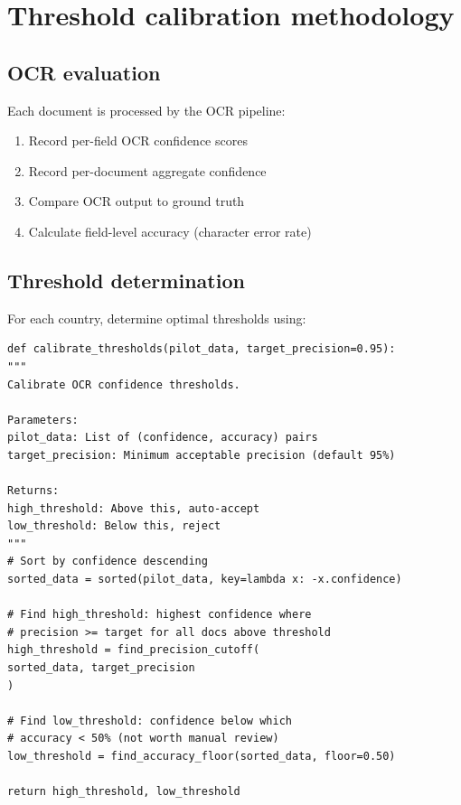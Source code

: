 \documentclass[11pt,a4paper,twoside]{report}
\begin{document}
\section{Threshold calibration methodology}

\subsection{OCR evaluation}

Each document is processed by the OCR pipeline:
\begin{enumerate}
\item Record per-field OCR confidence scores
\item Record per-document aggregate confidence
\item Compare OCR output to ground truth
\item Calculate field-level accuracy (character error rate)
\end{enumerate}

\subsection{Threshold determination}

For each country, determine optimal thresholds using:

\begin{lstlisting}[basicstyle=\ttfamily\small,caption={Threshold calibration algorithm.}]
def calibrate_thresholds(pilot_data, target_precision=0.95):
"""
Calibrate OCR confidence thresholds.

Parameters:
pilot_data: List of (confidence, accuracy) pairs
target_precision: Minimum acceptable precision (default 95%)

Returns:
high_threshold: Above this, auto-accept
low_threshold: Below this, reject
"""
# Sort by confidence descending
sorted_data = sorted(pilot_data, key=lambda x: -x.confidence)

# Find high_threshold: highest confidence where
# precision >= target for all docs above threshold
high_threshold = find_precision_cutoff(
sorted_data, target_precision
)

# Find low_threshold: confidence below which
# accuracy < 50% (not worth manual review)
low_threshold = find_accuracy_floor(sorted_data, floor=0.50)

return high_threshold, low_threshold
\end{lstlisting}
\end{document}
